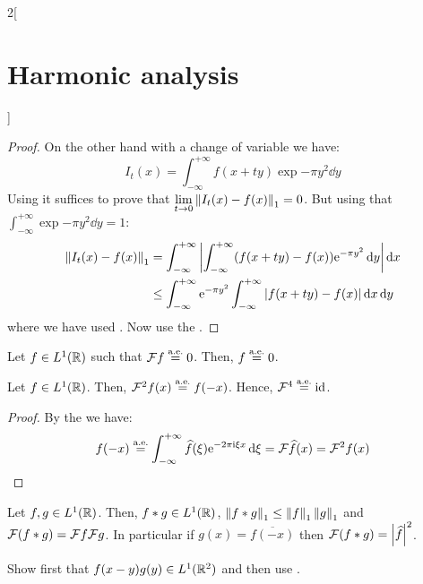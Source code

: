 \documentclass[../../../main_math.tex]{subfiles}
\begin{document}
\begin{multicols}{2}[\section{Harmonic analysis}]
\begin{proof}
    On the other hand with a change of variable we have: $$I_t(x)=\int_{-\infty}^{+\infty}f(x+ty)\exp{-\pi y^2}\dd{y}$$ Using  it suffices to prove that $\displaystyle\lim_{t\to 0}\left\|I_t(x)-f(x)\right\|_1=0$. But using that $\int_{-\infty}^{+\infty}\exp{-\pi y^2}\dd{y}=1$:
    \begin{align*}
      \left\|I_t(x)-f(x)\right\|_1 & =\int_{-\infty}^{+\infty}\abs{\int_{-\infty}^{+\infty}(f(x+ty)-f(x))\mathrm{e}^{-\pi y^2}\dd{y}}\dd{x}  \\
                           & \leq\int_{-\infty}^{+\infty}\mathrm{e}^{-\pi y^2}\int_{-\infty}^{+\infty}\abs{f(x+ty)-f(x)}\dd{x}\dd{y}
    \end{align*}
    where we have used . Now use the .
  \end{proof}
  \begin{corollary}
    Let $f\in L^1(\mathbb{R})$ such that $\mathcal{F} f\overset{\text{a.e.}}{=}0$. Then, $f\overset{\text{a.e.}}{=}0$.
  \end{corollary}
  \begin{corollary}\label{HA:periodicity}
    Let $f\in L^1(\mathbb{R})$. Then, $\mathcal{F}^2f(x)\overset{\text{a.e.}}{=}f(-x)$. Hence, $\mathcal{F}^4\overset{\text{a.e.}}{=}\mathrm{id}$.
  \end{corollary}
  \begin{proof}
    By the  we have:
    $$f(-x)\overset{\text{a.e.}}{=}\int_{-\infty}^{+\infty}\widehat{f}(\xi)\mathrm{e}^{-2\pi\mathrm{i}\xi x}\dd{\xi}=\mathcal{F}\widehat{f}(x)=\mathcal{F}^2 f(x)$$
  \end{proof}
  \begin{lemma}
    Let $f,g\in L^1(\mathbb{R})$. Then, $f*g\in L^1(\mathbb{R})$, $\left\|f*g\right\|_1\leq\left\|f\right\|_1\left\|g\right\|_1$ and $\mathcal{F}(f*g)=\mathcal{F} f \mathcal{F} g$. In particular if $g(x)=\overline{f(-x)}$ then $\mathcal{F}(f*g)=\abs{\widehat{f}}^2$.
  \end{lemma}
  \begin{sproof}
    Show first that $f(x-y)g(y)\in L^1(\mathbb{R}^2)$ and then use .
  \end{sproof}

\end{multicols}
\end{document}
